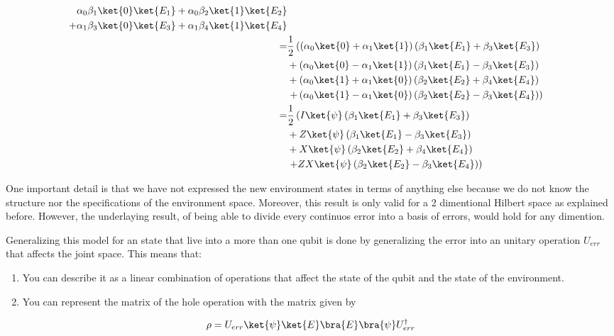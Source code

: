 \begin{align*}
\alpha_0\beta_1 \ket{0}\ket{E_1} +
\alpha_0\beta_2 \ket{1}\ket{E_2}\\
+ \alpha_1\beta_3 \ket{0}\ket{E_3} +
\alpha_1\beta_4 \ket{1}\ket{E_4}&\\
=&\frac{1}{2} \left(\left(\alpha_0 \ket{0} + \alpha_1 \ket{1}\right)\left(\beta_1 \ket{E_1} + \beta_3 \ket{E_3}\right)\right.\\
& + \left(\alpha_0 \ket{0} - \alpha_1 \ket{1}\right)\left(\beta_1 \ket{E_1} - \beta_3 \ket{E_3}\right)\\
& + \left(\alpha_0 \ket{1} + \alpha_1 \ket{0}\right)\left(\beta_2 \ket{E_2} + \beta_4 \ket{E_4}\right)\\
&\left. + \left(\alpha_0 \ket{1} - \alpha_1 \ket{0}\right)\left(\beta_2 \ket{E_2} - \beta_3 \ket{E_4}\right)\right)\\
=&\frac{1}{2} \left(I\ket{\psi}\left(\beta_1 \ket{E_1} + \beta_3 \ket{E_3}\right)\right.\\
& + Z\ket{\psi}\left(\beta_1 \ket{E_1} - \beta_3 \ket{E_3}\right)\\
& + X\ket{\psi}\left(\beta_2 \ket{E_2} + \beta_4 \ket{E_4}\right)\\
&\left. + ZX\ket{\psi}\left(\beta_2 \ket{E_2} - \beta_3 \ket{E_4}\right)\right)\\
\end{align*}

One important detail is that we have not expressed the new environment states in terms of anything else because we do not know the structure nor the specifications of the environment space. Moreover, this result is only valid for a 2 dimentional Hilbert space as explained before. However, the underlaying result, of being able to divide every continuos error into a basis of errors, would hold for any dimention.

Generalizing this model for an state that live into a more than one qubit is done by generalizing the error into an unitary operation $U_{err}$ that affects the joint space. This means that:

\begin{enumerate}
\item You can describe it as a linear combination of operations that affect the state of the qubit and the state of the environment.
\item You can represent the matrix of the hole operation with the matrix given by
\end{enumerate}

\begin{equation}
\rho = U_{err}\ket{\psi}\ket{E}\bra{E}\bra{\psi}U_{err}^\dagger
\end{equation}

